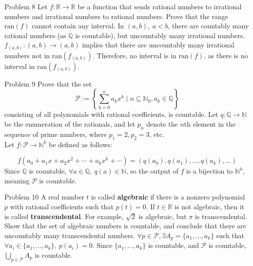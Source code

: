 \documentclass[10pt]{extarticle}
\begin{document}
  \begin{problem}{Problem 8}
    Let $f:\mathbb{R} \rightarrow \mathbb{R}$ be a function that sends rational numbers to irrational numbers and irrational numbers to rational numbers. Prove that the range $\textrm{ran}(f)$ cannot contain any interval.
    \tcblower
    In $(a,b),~a<b$, there are countably many rational numbers (as $\mathbb{Q}$ is countable), but uncountably many irrational numbers.\\

    $f_{(a,b)}: (a,b) \rightarrow (a,b)$ implies that there are uncountably many irrational numbers not in $\textrm{ran}(f_{(a,b)})$. Therefore, no interval is in $\textrm{ran}(f)$, as there is no interval in $\textrm{ran}(f_{(a,b)})$.
  \end{problem}
  \begin{problem}{Problem 9}
    Prove that the set
    \[
      \mathcal{P} := \left\{\sum_{k=0}^{n}a_kx^k \mid n\subseteq \mathbb{N}_0,a_k\in\mathbb{Q}\right\}
    \] 
    consisting of all polynomials with rational coefficients, is countable.
    \tcblower
    Let $q: \mathbb{Q} \rightarrow \mathbb{N}$ be the enumeration of the rationals, and let $p_n$ denote the $n$th element in the sequence of prime numbers, where $p_1 = 2, p_2 = 3$, etc.\\

    Let $f: \mathcal{P} \rightarrow \mathbb{N}^k$ be defined as follows:

    \[
      f(a_0 + a_1x + a_2x^2 + \cdots + a_kx^k + \cdots) = (q(a_0),q(a_1),\dots,q(a_k),\dots)
    \] 
    Since $\mathbb{Q}$ is countable, $\forall a\in \mathbb{Q},~q(a)\in \mathbb{N}$, so the output of $f$ is a bijection to $\mathbb{N}^k$, meaning $\mathcal{P}$ is countable.
  \end{problem}
  \begin{problem}{Problem 10}
    A real number $t$ is called \textbf{algebraic} if there is a nonzero polynomial $p$ with rational coefficients such that $p(t) = 0$. If $t\in \mathbb{R}$ is not algebraic, then it is called \textbf{transcendental}. For example, $\sqrt{2}$ is algebraic, but $\pi$ is transcendental. Show that the set of algebraic numbers is countable, and conclude that there are uncountably many transcendental numbers.
    \tcblower
    $\forall p\in \mathcal{P},\exists A_p = \{a_1,\dots,a_k\}$ such that $\forall a_i\in \{a_1,\dots,a_k\},~p(a_i) = 0$. Since $\{a_1,\dots,a_k\}$ is countable, and $\mathcal{P}$ is countable, $\displaystyle\bigcup_{p\in \mathcal{P}} A_{p}$ is countable.
  \end{problem}
\end{document}
